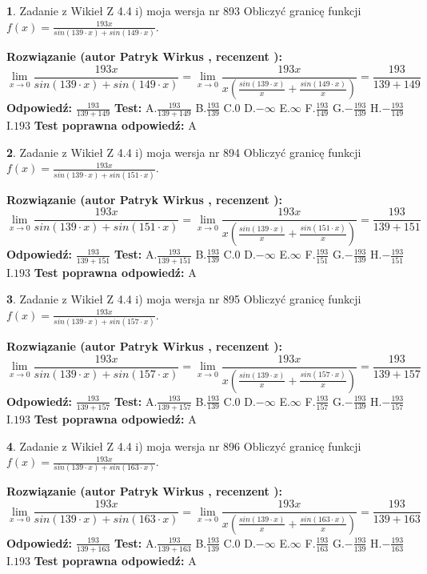 \documentclass[12pt, a4paper]{article}
\theoremstyle{definition} %
\newtheorem{zad}{}
\newcommand{\zadStart}[1]{\begin{zad}#1\newline}
\newcommand{\zadStop}{\end{zad}}
\newcommand{\rozwStart}[2]{\noindent \textbf{Rozwiązanie (autor #1 , recenzent #2): }\newline}
\newcommand{\rozwStop}{\newline}
\newcommand{\odpStart}{\noindent \textbf{Odpowiedź:}\newline}
\newcommand{\odpStop}{\newline}
\newcommand{\testStart}{\noindent \textbf{Test:}\newline}
\newcommand{\testStop}{\newline}
\newcommand{\kluczStart}{\noindent \textbf{Test poprawna odpowiedź:}\newline}
\newcommand{\kluczStop}{\newline}
\begin{document}
\zadStart{Zadanie z Wikieł Z 4.4 i) moja wersja nr 893}
Obliczyć granicę funkcji $f(x)=\frac{193x}{sin(139\cdot x) +sin(149\cdot x)}$.
\zadStop
\rozwStart{Patryk Wirkus}{}
$$\lim\limits_{x\to 0}\frac{193x}{sin(139\cdot x) +sin(149\cdot x)}=\lim\limits_{x\to 0}\frac{193x}{x(\frac{sin(139\cdot x)}{x}+\frac{sin(149\cdot x)}{x})}=\frac{193}{139+149}$$
\rozwStop
\odpStart
$\frac{193}{139+149}$
\odpStop
\testStart
A.$\frac{193}{139+149}$
B.$\frac{193}{139}$
C.$0$
D.$-\infty$
E.$\infty$
F.$\frac{193}{149}$
G.$-\frac{193}{139}$
H.$-\frac{193}{149}$
I.$193$
\testStop
\kluczStart
A
\kluczStop



\zadStart{Zadanie z Wikieł Z 4.4 i) moja wersja nr 894}
Obliczyć granicę funkcji $f(x)=\frac{193x}{sin(139\cdot x) +sin(151\cdot x)}$.
\zadStop
\rozwStart{Patryk Wirkus}{}
$$\lim\limits_{x\to 0}\frac{193x}{sin(139\cdot x) +sin(151\cdot x)}=\lim\limits_{x\to 0}\frac{193x}{x(\frac{sin(139\cdot x)}{x}+\frac{sin(151\cdot x)}{x})}=\frac{193}{139+151}$$
\rozwStop
\odpStart
$\frac{193}{139+151}$
\odpStop
\testStart
A.$\frac{193}{139+151}$
B.$\frac{193}{139}$
C.$0$
D.$-\infty$
E.$\infty$
F.$\frac{193}{151}$
G.$-\frac{193}{139}$
H.$-\frac{193}{151}$
I.$193$
\testStop
\kluczStart
A
\kluczStop



\zadStart{Zadanie z Wikieł Z 4.4 i) moja wersja nr 895}
Obliczyć granicę funkcji $f(x)=\frac{193x}{sin(139\cdot x) +sin(157\cdot x)}$.
\zadStop
\rozwStart{Patryk Wirkus}{}
$$\lim\limits_{x\to 0}\frac{193x}{sin(139\cdot x) +sin(157\cdot x)}=\lim\limits_{x\to 0}\frac{193x}{x(\frac{sin(139\cdot x)}{x}+\frac{sin(157\cdot x)}{x})}=\frac{193}{139+157}$$
\rozwStop
\odpStart
$\frac{193}{139+157}$
\odpStop
\testStart
A.$\frac{193}{139+157}$
B.$\frac{193}{139}$
C.$0$
D.$-\infty$
E.$\infty$
F.$\frac{193}{157}$
G.$-\frac{193}{139}$
H.$-\frac{193}{157}$
I.$193$
\testStop
\kluczStart
A
\kluczStop



\zadStart{Zadanie z Wikieł Z 4.4 i) moja wersja nr 896}
Obliczyć granicę funkcji $f(x)=\frac{193x}{sin(139\cdot x) +sin(163\cdot x)}$.
\zadStop
\rozwStart{Patryk Wirkus}{}
$$\lim\limits_{x\to 0}\frac{193x}{sin(139\cdot x) +sin(163\cdot x)}=\lim\limits_{x\to 0}\frac{193x}{x(\frac{sin(139\cdot x)}{x}+\frac{sin(163\cdot x)}{x})}=\frac{193}{139+163}$$
\rozwStop
\odpStart
$\frac{193}{139+163}$
\odpStop
\testStart
A.$\frac{193}{139+163}$
B.$\frac{193}{139}$
C.$0$
D.$-\infty$
E.$\infty$
F.$\frac{193}{163}$
G.$-\frac{193}{139}$
H.$-\frac{193}{163}$
I.$193$
\testStop
\kluczStart
A
\kluczStop
\end{document}
